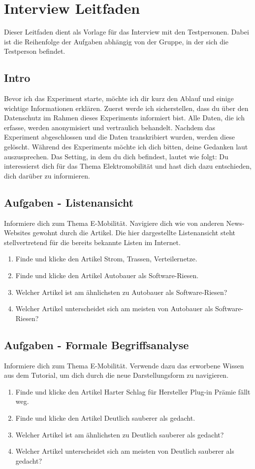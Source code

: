 \section{Interview Leitfaden}
Dieser Leitfaden dient als Vorlage für das Interview mit den Testpersonen.
Dabei ist die Reihenfolge der Aufgaben abhängig von der Gruppe, in der sich die Testperson befindet.

\subsection{Intro}
Bevor ich das Experiment starte, möchte ich dir kurz den Ablauf und einige wichtige Informationen erklären. 
Zuerst werde ich sicherstellen, dass du über den Datenschutz im Rahmen dieses Experiments informiert bist.
Alle Daten, die ich erfasse, werden anonymisiert und vertraulich behandelt.
Nachdem das Experiment abgeschlossen und die Daten transkribiert wurden, werden diese gelöscht.
Während des Experiments möchte ich dich bitten, deine Gedanken laut auszusprechen.
Das Setting, in dem du dich befindest, lautet wie folgt: \glqq Du interessierst dich für das Thema Elektromobilität und hast dich dazu entschieden, dich darüber zu informieren.\grqq{}

\subsection{Aufgaben - Listenansicht}
Informiere dich zum Thema E-Mobilität.
Navigiere dich wie von anderen News-Websites gewohnt durch die Artikel.
Die hier dargestellte Listenansicht steht stellvertretend für die bereits bekannte Listen im Internet.
\begin{enumerate}
    \item Finde und klicke den Artikel \glqq Strom, Trassen, Verteilernetze\grqq{}.
    \item Finde und klicke den Artikel \glqq Autobauer als Software-Riesen\grqq{}.
    \item Welcher Artikel ist am ähnlichsten zu \glqq Autobauer als Software-Riesen\grqq{}?
    \item Welcher Artikel unterscheidet sich am meisten von \glqq Autobauer als Software-Riesen\grqq{}?
\end{enumerate}

\subsection{Aufgaben - Formale Begriffsanalyse}
Informiere dich zum Thema E-Mobilität.
Verwende dazu das erworbene Wissen aus dem Tutorial, um dich durch die neue Darstellungsform zu navigieren.
\begin{enumerate}
    \item Finde und klicke den Artikel \glqq Harter Schlag für Hersteller Plug-in Prämie fällt weg\grqq{}.
    \item Finde und klicke den Artikel \glqq Deutlich sauberer als gedacht\grqq{}.
    \item Welcher Artikel ist am ähnlichsten zu \glqq Deutlich sauberer als gedacht\grqq{}?
    \item Welcher Artikel unterscheidet sich am meisten von \glqq Deutlich sauberer als gedacht\grqq{}?
\end{enumerate}